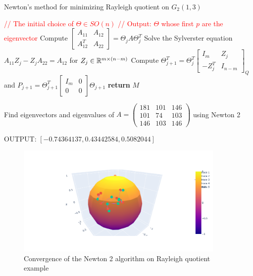 \documentclass[11pt,a4paper]{report}
\begin{document}
\begin{algorithm}
\caption{Newton's method for minimizing Rayleigh quotient on $G_2(1,3)$ }
    \begin{algorithmic}[1]
        \State \textcolor{red}{// The initial choice of $\Theta \in SO(n)$}
        \State \textcolor{red}{// Output: $\Theta$ whose first $p$ are the eigenvector}
        \State Compute $\begin{bmatrix} A_{11} & A_{12} \\ A_{12}^T & A_{22} \end{bmatrix} = \Theta_j A \Theta_j^T$
        \State Solve the Sylverster equation $A_{11} Z_j - Z_j A_{22} = A_{12}$ for $Z_j \in \mathbb{R}^{m \times (n-m)}$
        \State 
        \State Compute $\Theta_{j+1}^T = \Theta_j^T \begin{bmatrix} I_m & Z_j \\ -Z_j^T & I_{n-m} \end{bmatrix}_Q $ 
        and 
        $ P_{j+1} = \Theta_{j+1}^T \begin{bmatrix} I_m & 0 \\ 0 & 0 \end{bmatrix} \Theta_{j+1} $
        \EndWhile
        \State \textbf{return} $M$
        \EndProcedure
    \end{algorithmic}
\end{algorithm}
\begin{Ex}
    Find eigenvectors and eigenvalues of $A = \begin{pmatrix} 181 & 101 & 146 \\ 101 & 74 & 103 \\ 146 & 103 & 146 \end{pmatrix} $ using Newton 2
\end{Ex}
OUTPUT: $ [-0.74364137,  0.43442584,  0.5082044 ]$
\begin{figure}[h] \label{gradR2}
    \centering
    \includegraphics[width=0.90\textwidth]{newton2.png}
    \caption{Convergence of the Newton 2 algorithm on Rayleigh quotient example}
\end{figure}
\end{document}

